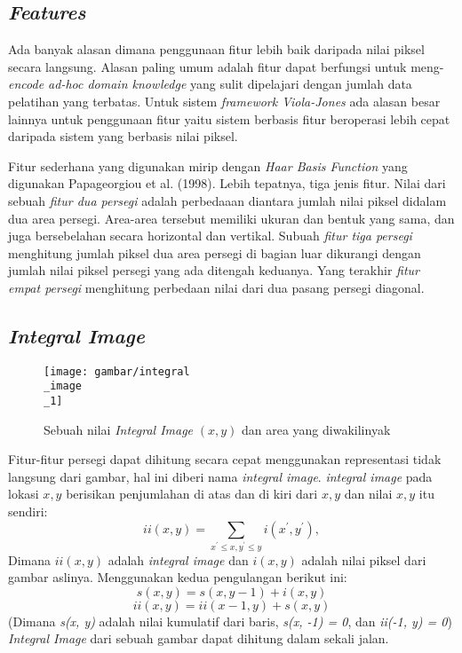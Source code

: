 \subsection{\emph{Features}}

Ada banyak alasan dimana penggunaan fitur lebih baik daripada 
nilai piksel secara langsung. Alasan paling umum adalah fitur dapat berfungsi
untuk meng-\emph{encode ad-hoc domain knowledge} yang sulit dipelajari 
dengan jumlah data pelatihan yang terbatas. Untuk sistem \emph{framework Viola-Jones} 
ada alasan besar lainnya untuk penggunaan fitur yaitu sistem berbasis fitur beroperasi lebih cepat
daripada sistem yang berbasis nilai piksel.

Fitur sederhana yang digunakan mirip dengan \emph{Haar Basis Function} yang 
digunakan Papageorgiou et al. (1998). Lebih tepatnya, tiga jenis fitur. 
Nilai dari sebuah \emph{fitur dua persegi} adalah perbedaaan diantara 
jumlah nilai piksel didalam dua area persegi. Area-area tersebut memiliki 
ukuran dan bentuk yang sama, dan juga bersebelahan secara horizontal dan vertikal.
Subuah \emph{fitur tiga persegi} menghitung jumlah piksel dua area persegi 
di bagian luar dikurangi dengan jumlah nilai piksel persegi yang ada ditengah keduanya. 
Yang terakhir \emph{fitur empat persegi} menghitung perbedaan nilai dari dua pasang 
persegi diagonal.

\subsection{\emph{Integral Image}}

\begin{figure}[H]
  \centering{}
	\texttt{[image: gambar/integral\\\_image\\\_1]}
  \caption{Sebuah nilai \emph{Integral Image} $(x,y)$ dan area yang diwakilinyak}
\end{figure}

Fitur-fitur persegi dapat dihitung secara cepat menggunakan 
representasi tidak langsung dari gambar, hal ini diberi nama 
\emph{integral image}. \emph{integral image} pada lokasi $x, y$ berisikan 
penjumlahan di atas dan di kiri dari $x, y$ dan nilai $x, y$ itu sendiri:
\begin{equation}
  i i(x, y)=\sum_{x^{\prime} \leq x, y^{\prime} \leq y} i\left(x^{\prime}, y^{\prime}\right),
\end{equation}
Dimana $ii(x,y)$ adalah \emph{integral image} dan $i(x,y)$ 
adalah nilai piksel dari gambar aslinya. Menggunakan kedua 
pengulangan berikut ini:
\begin{equation}
  s(x, y)=s(x, y-1) + i(x, y)
\end{equation}
\begin{equation}
  ii(x, y)=ii(x-1, y) + s(x, y)
\end{equation}
(Dimana \emph{s(x, y)} adalah nilai kumulatif dari baris, \emph{s(x, -1) = 0}, 
dan \emph{ii(-1, y) = 0}) \emph{Integral Image} dari sebuah gambar dapat dihitung dalam sekali jalan.

